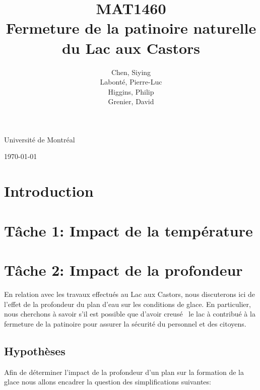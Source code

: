 \documentclass[12pt]{article}
\title{MAT1460\\[3ex]Fermeture de la patinoire naturelle du Lac aux Castors}
\author{Chen, Siying\\[1ex] Labont\'e, Pierre-Luc\\[1ex]Higgins, Philip\\[1ex] Grenier, David}
\date{}
\numberwithin{figure}{section}
\begin{document}
\maketitle
\thispagestyle{empty}
\vfill
\begin{center}
Universit\'e de Montr\'eal

\today
\end{center}
\clearpage

\tableofcontents
\newpage
\section{Introduction}
\section{T\^ache 1: Impact de la temp\'erature}
\newpage
\section{T\^ache 2: Impact de la profondeur}

En relation avec les travaux effectu\'es au Lac aux Castors, nous discuterons ici de l'effet de la
profondeur du plan d'eau sur les conditions de glace. En particulier, nous cherchons \`a savoir s'il est
possible que d'avoir creus\'e~\cite{Lac} le lac \`a contribu\'e \`a la fermeture de la patinoire pour
assurer la s\'ecurit\'e du personnel et des citoyens.

\subsection{Hypoth\`eses}

Afin de d\'eterminer l'impact de la profondeur d'un plan sur la formation de la glace nous allons
encadrer la question des simplifications suivantes:
\end{document}

